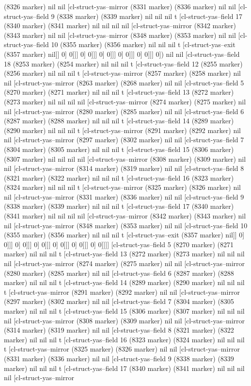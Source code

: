 {{(8326 marker) nil nil [cl-struct-yas--mirror (8331 marker) (8336 marker) nil nil [cl-struct-yas--field 9 (8338 marker) (8339 marker) nil nil nil t [cl-struct-yas--field 17 (8340 marker) (8341 marker) nil nil nil nil [cl-struct-yas--mirror (8342 marker) (8343 marker) nil nil [cl-struct-yas--mirror (8348 marker) (8353 marker) nil nil [cl-struct-yas--field 10 (8355 marker) (8356 marker) nil nil nil t [cl-struct-yas--exit (8357 marker) nil]] 0] 0]]] 0] 0]]] 0] 0]]] 0] 0]]] 0] 0]]] 0]) nil nil [cl-struct-yas--field 18 (8253 marker) (8254 marker) nil nil nil t [cl-struct-yas--field 12 (8255 marker) (8256 marker) nil nil nil t [cl-struct-yas--mirror (8257 marker) (8258 marker) nil nil [cl-struct-yas--mirror (8263 marker) (8268 marker) nil nil [cl-struct-yas--field 5 (8270 marker) (8271 marker) nil nil nil t [cl-struct-yas--field 13 (8272 marker) (8273 marker) nil nil nil nil [cl-struct-yas--mirror (8274 marker) (8275 marker) nil nil [cl-struct-yas--mirror (8280 marker) (8285 marker) nil nil [cl-struct-yas--field 6 (8287 marker) (8288 marker) nil nil nil t [cl-struct-yas--field 14 (8289 marker) (8290 marker) nil nil nil t [cl-struct-yas--mirror (8291 marker) (8292 marker) nil nil [cl-struct-yas--mirror (8297 marker) (8302 marker) nil nil [cl-struct-yas--field 7 (8304 marker) (8305 marker) nil nil nil t [cl-struct-yas--field 15 (8306 marker) (8307 marker) nil nil nil nil [cl-struct-yas--mirror (8308 marker) (8309 marker) nil nil [cl-struct-yas--mirror (8314 marker) (8319 marker) nil nil [cl-struct-yas--field 8 (8321 marker) (8322 marker) nil nil nil t [cl-struct-yas--field 16 (8323 marker) (8324 marker) nil nil nil t [cl-struct-yas--mirror (8325 marker) (8326 marker) nil nil [cl-struct-yas--mirror (8331 marker) (8336 marker) nil nil [cl-struct-yas--field 9 (8338 marker) (8339 marker) nil nil nil t [cl-struct-yas--field 17 (8340 marker) (8341 marker) nil nil nil nil [cl-struct-yas--mirror (8342 marker) (8343 marker) nil nil [cl-struct-yas--mirror (8348 marker) (8353 marker) nil nil [cl-struct-yas--field 10 (8355 marker) (8356 marker) nil nil nil t [cl-struct-yas--exit (8357 marker) nil]] 0] 0]]] 0] 0]]] 0] 0]]] 0] 0]]] 0] 0]]] 0] 0]]]] [cl-struct-yas--field 5 (8270 marker) (8271 marker) nil nil nil t [cl-struct-yas--field 13 (8272 marker) (8273 marker) nil nil nil nil [cl-struct-yas--mirror (8274 marker) (8275 marker) nil nil [cl-struct-yas--mirror (8280 marker) (8285 marker) nil nil [cl-struct-yas--field 6 (8287 marker) (8288 marker) nil nil nil t [cl-struct-yas--field 14 (8289 marker) (8290 marker) nil nil nil t [cl-struct-yas--mirror (8291 marker) (8292 marker) nil nil [cl-struct-yas--mirror (8297 marker) (8302 marker) nil nil [cl-struct-yas--field 7 (8304 marker) (8305 marker) nil nil nil t [cl-struct-yas--field 15 (8306 marker) (8307 marker) nil nil nil nil [cl-struct-yas--mirror (8308 marker) (8309 marker) nil nil [cl-struct-yas--mirror (8314 marker) (8319 marker) nil nil [cl-struct-yas--field 8 (8321 marker) (8322 marker) nil nil nil t [cl-struct-yas--field 16 (8323 marker) (8324 marker) nil nil nil t [cl-struct-yas--mirror (8325 marker) (8326 marker) nil nil [cl-struct-yas--mirror (8331 marker) (8336 marker) nil nil [cl-struct-yas--field 9 (8338 marker) (8339 marker) nil nil nil t [cl-struct-yas--field 17 (8340 marker) (8341 marker) nil nil nil nil [cl-struct-yas--mirror }}
